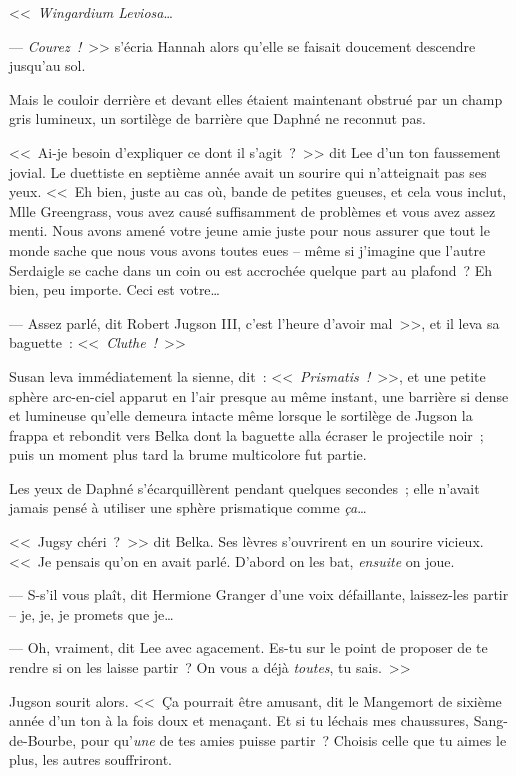 <<~\emph{Wingardium Leviosa}…

--- \emph{Courez~!}~>> s'écria Hannah alors qu'elle se faisait doucement descendre jusqu'au sol.

Mais le couloir derrière et devant elles étaient maintenant obstrué par un champ gris lumineux, un sortilège de barrière que Daphné ne reconnut pas.

<<~Ai-je besoin d'expliquer ce dont il s'agit~?~>> dit Lee d'un ton faussement jovial. Le duettiste en septième année avait un sourire qui n'atteignait pas ses yeux. <<~Eh bien, juste au cas où, bande de petites gueuses, et cela vous inclut, Mlle Greengrass, vous avez causé suffisamment de problèmes et vous avez assez menti. Nous avons amené votre jeune amie juste pour nous assurer que tout le monde sache que nous vous avons toutes eues -- même si j'imagine que l'autre Serdaigle se cache dans un coin ou est accrochée quelque part au plafond~? Eh bien, peu importe. Ceci est votre…

--- Assez parlé, dit Robert Jugson III, c'est l'heure d'avoir mal~>>, et il leva sa baguette~: <<~\emph{Cluthe~!}~>>

Susan leva immédiatement la sienne, dit~: <<~\emph{Prismatis~!}~>>, et une petite sphère arc-en-ciel apparut en l'air presque au même instant, une barrière si dense et lumineuse qu'elle demeura intacte même lorsque le sortilège de Jugson la frappa et rebondit vers Belka dont la baguette alla écraser le projectile noir~; puis un moment plus tard la brume multicolore fut partie.

Les yeux de Daphné s'écarquillèrent pendant quelques secondes~; elle n'avait jamais pensé à utiliser une sphère prismatique comme \emph{ça}…

<<~Jugsy chéri~?~>> dit Belka. Ses lèvres s'ouvrirent en un sourire vicieux. <<~Je pensais qu'on en avait parlé. D'abord on les bat, \emph{ensuite} on joue.

--- S-s'il vous plaît, dit Hermione Granger d'une voix défaillante, laissez-les partir -- je, je, je promets que je…

--- Oh, vraiment, dit Lee avec agacement. Es-tu sur le point de proposer de te rendre si on les laisse partir~? On vous a déjà \emph{toutes}, tu sais.~>>

Jugson sourit alors. <<~Ça pourrait être amusant, dit le Mangemort de sixième année d'un ton à la fois doux et menaçant. Et si tu léchais mes chaussures, Sang-de-Bourbe, pour qu'\emph{une} de tes amies puisse partir~? Choisis celle que tu aimes le plus, les autres souffriront.

